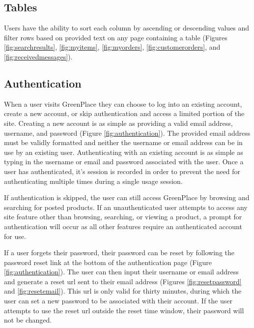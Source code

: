 \documentclass[letterpaper, 10 pt, conference]{ieeeconf}  %
\begin{document}
\subsection{Tables}

Users have the ability to sort each column by ascending or descending values and filter rows based on provided text on any page containing a table (Figures \ref{fig:searchresults}, \ref{fig:myitems}, \ref{fig:myorders}, \ref{fig:customerorders}, and \ref{fig:receivedmessages}).

\subsection{Authentication}

When a user visits GreenPlace they can choose to log into an existing account, create a new account, or skip authentication and access a limited portion of the site. Creating a new account is as simple as providing a valid email address, username, and password (Figure \ref{fig:authentication}). The provided email address must be validly formatted and neither the username or email address can be in use by an existing user. Authenticating with an existing account is as simple as typing in the username or email and password associated with the user. Once a user has authenticated, it's session is recorded in order to prevent the need for authenticating multiple times during a single usage session.

If authentication is skipped, the user can still access GreenPlace by browsing and searching for posted products. If an unauthenticated user attempts to access any site feature other than browsing, searching, or viewing a product, a prompt for authentication will occur as all other features require an authenticated account for use.

If a user forgets their password, their password can be reset by following the password reset link at the bottom of the authentication page (Figure \ref{fig:authentication}). The user can then input their username or email address and generate a reset url sent to their email address (Figures \ref{fig:resetpassword} and \ref{fig:resetemail}). This url is only valid for thirty minutes, during which the user can set a new password to be associated with their account. If the user attempts to use the reset url outside the reset time window, their password will not be changed.
\end{document}

